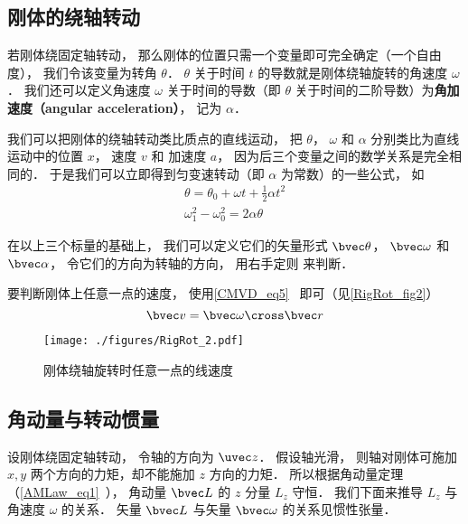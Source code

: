 

\subsection{刚体的绕轴转动}

若刚体绕固定轴转动， 那么刚体的位置只需一个变量即可完全确定（一个自由度）， 我们令该变量为转角 $\theta$． $\theta$ 关于时间 $t$ 的导数就是刚体绕轴旋转的角速度 $\omega$． 我们还可以定义角速度 $\omega$ 关于时间的导数（即 $\theta$ 关于时间的二阶导数）为\textbf{角加速度（angular acceleration）}， 记为 $\alpha$．

我们可以把刚体的绕轴转动类比质点的直线运动， 把 $\theta$， $\omega$ 和 $\alpha$ 分别类比为直线运动中的位置 $x$， 速度 $v$ 和 加速度 $a$， 因为后三个变量之间的数学关系是完全相同的． 于是我们可以立即得到匀变速转动（即 $\alpha$ 为常数）的一些公式， 如
\begin{gather}
\theta = \theta_0 + \omega t + \frac12 \alpha t^2\\
\omega_1^2 - \omega_0^2 = 2\alpha \theta
\end{gather}

在以上三个标量的基础上， 我们可以定义它们的矢量形式 $\bvec \theta$， $\bvec \omega$ 和 $\bvec \alpha$， 令它们的方向为转轴的方向， 用右手定则 来判断．

要判断刚体上任意一点的速度， 使用\autoref{CMVD_eq5}~ 即可（见\autoref{RigRot_fig2}）
\begin{equation}
\bvec v = \bvec \omega \cross \bvec r
\end{equation}

\begin{figure}[ht]
\centering
\texttt{[image: ./figures/RigRot\_2.pdf]}
\caption{刚体绕轴旋转时任意一点的线速度} \label{RigRot_fig2}
\end{figure}

\subsection{角动量与转动惯量}

设刚体绕固定轴转动， 令轴的方向为 $\uvec z$． 假设轴光滑， 则轴对刚体可施加 $x, y$ 两个方向的力矩，却不能施加 $z$ 方向的力矩． 所以根据角动量定理（\autoref{AMLaw_eq1}~）， 角动量 $\bvec L$ 的 $z$ 分量 $L_z$ 守恒． 我们下面来推导 $L_z$ 与角速度 $\omega$ 的关系． 矢量 $\bvec L$ 与矢量 $\bvec \omega$ 的关系见惯性张量．

